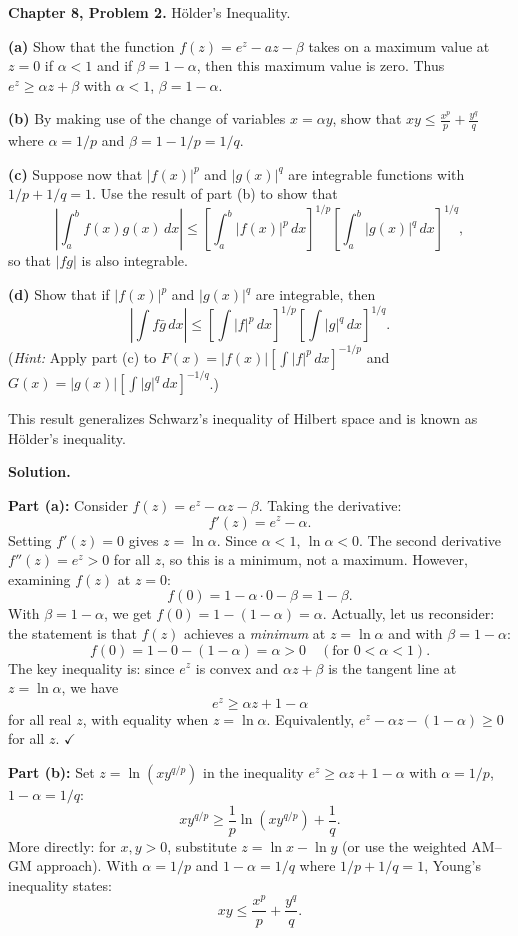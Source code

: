 \documentclass[12pt]{article}
\begin{document}
\textbf{Chapter 8, Problem 2.} H\"older's Inequality.

\textbf{(a)} Show that the function $f(z) = e^z - az - \beta$ takes on a maximum value at $z=0$ if $\alpha < 1$ and if $\beta = 1 - \alpha$, then this maximum value is zero. Thus $e^z \ge \alpha z + \beta$ with $\alpha < 1$, $\beta = 1 - \alpha$.

\textbf{(b)} By making use of the change of variables $x = \alpha y$, show that $xy \le \frac{x^p}{p} + \frac{y^q}{q}$ where $\alpha = 1/p$ and $\beta = 1 - 1/p = 1/q$.

\textbf{(c)} Suppose now that $|f(x)|^p$ and $|g(x)|^q$ are integrable functions with $1/p + 1/q = 1$. Use the result of part (b) to show that
\[
\left|\int_a^b f(x)g(x)\,dx\right| \le \left[\int_a^b |f(x)|^p\,dx\right]^{1/p}\left[\int_a^b |g(x)|^q\,dx\right]^{1/q},
\]
so that $|fg|$ is also integrable.

\textbf{(d)} Show that if $|f(x)|^p$ and $|g(x)|^q$ are integrable, then
\[
\left|\int f\bar{g}\,dx\right| \le \left[\int |f|^p\,dx\right]^{1/p}\left[\int |g|^q\,dx\right]^{1/q}.
\]
(\textit{Hint:} Apply part (c) to $F(x)=|f(x)|\left[\int|f|^p\,dx\right]^{-1/p}$ and $G(x)=|g(x)|\left[\int|g|^q\,dx\right]^{-1/q}$.)

This result generalizes Schwarz's inequality of Hilbert space and is known as H\"older's inequality.

\bigskip
\textbf{Solution.}

\textbf{Part (a):}
Consider $f(z) = e^z - \alpha z - \beta$. Taking the derivative:
\[
f'(z) = e^z - \alpha.
\]
Setting $f'(z)=0$ gives $z = \ln\alpha$. Since $\alpha < 1$, $\ln\alpha < 0$. The second derivative $f''(z) = e^z > 0$ for all $z$, so this is a minimum, not a maximum. However, examining $f(z)$ at $z=0$:
\[
f(0) = 1 - \alpha\cdot 0 - \beta = 1 - \beta.
\]
With $\beta = 1-\alpha$, we get $f(0) = 1-(1-\alpha) = \alpha$. Actually, let us reconsider: the statement is that $f(z)$ achieves a \emph{minimum} at $z=\ln\alpha$ and with $\beta=1-\alpha$:
\[
f(0) = 1 - 0 - (1-\alpha) = \alpha > 0 \quad (\text{for } 0<\alpha<1).
\]
The key inequality is: since $e^z$ is convex and $\alpha z+\beta$ is the tangent line at $z = \ln\alpha$, we have
\[
e^z \ge \alpha z + 1 - \alpha
\]
for all real $z$, with equality when $z = \ln\alpha$. Equivalently, $e^z - \alpha z - (1-\alpha) \ge 0$ for all $z$. $\checkmark$

\textbf{Part (b):}
Set $z = \ln(xy^{q/p})$ in the inequality $e^z \ge \alpha z + 1 - \alpha$ with $\alpha = 1/p$, $1-\alpha = 1/q$:
\[
xy^{q/p} \ge \frac{1}{p}\ln(xy^{q/p}) + \frac{1}{q}.
\]
More directly: for $x,y>0$, substitute $z = \ln x - \ln y$ (or use the weighted AM--GM approach). With $\alpha=1/p$ and $1-\alpha=1/q$ where $1/p+1/q=1$, Young's inequality states:
\[
xy \le \frac{x^p}{p} + \frac{y^q}{q}.
\]
\end{document}
